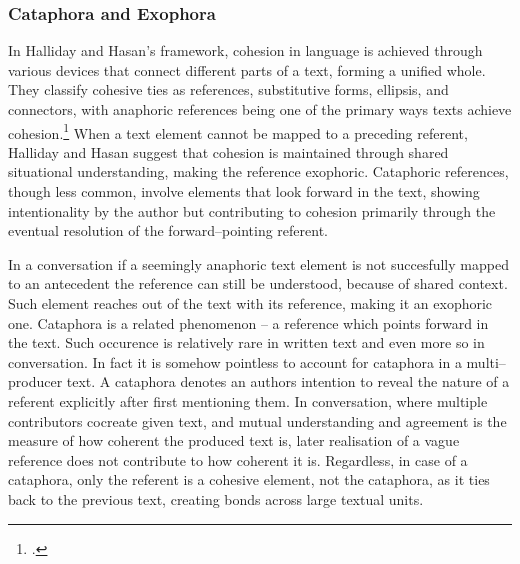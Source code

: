 \documentclass[12pt]{report}
\begin{document}
{\subsubsection{Cataphora and Exophora}
\par
    In Halliday and Hasan's framework,
    cohesion in language is achieved through various devices that connect
    different parts of a text, forming a unified whole.
    They classify cohesive ties as
    references, substitutive forms, ellipsis, and connectors, with
    anaphoric references being one of the primary ways texts achieve cohesion.\footcite[p.~68]{Halliday76cohesion}
    When a text element cannot be mapped to a preceding referent,
    Halliday and Hasan suggest that cohesion is maintained through
    shared situational understanding, making the reference exophoric.
    Cataphoric references, though less common, involve
    elements that look forward in the text,
    showing intentionality by the author but contributing to
    cohesion primarily through the eventual resolution of the forward–pointing referent.

\par
    In a conversation if a seemingly anaphoric text element is not succesfully mapped
    to an antecedent
    the reference can still be understood, because of shared context.
    Such element reaches out of the text with its reference, making it an exophoric one.
    Cataphora is a related phenomenon –
    a reference which points forward in the text.
    Such occurence is relatively rare in written text and even more so in conversation.
    In fact it is somehow pointless to account for cataphora in a multi–producer text.
    A cataphora denotes an authors intention to reveal
    the nature of a referent explicitly after first mentioning them.
    In conversation, where multiple contributors cocreate given text,
    and mutual understanding and agreement is the measure of
    how coherent the produced text is, later realisation of a vague reference
    does not contribute to how coherent it is.
    Regardless, in case of a cataphora,
    only the referent is a cohesive element,
    not the cataphora,
    as it ties back to the previous text, creating bonds across large textual units.

}
\end{document}

